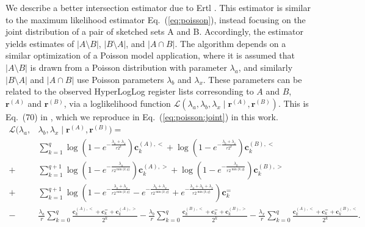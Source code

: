 \documentclass[10]{report}
\begin{document}
We describe a better intersection estimator due to Ertl \cite{ertl2017new}.
This estimator is similar to the maximum likelihood estimator Eq.~(\ref{eq:poisson}), instead focusing on the joint distribution of a pair of sketched sets A and B.
Accordingly, the estimator yields estimates of $|A \setminus B|$, $|B \setminus A|$, and $|A \cap B|$. 
The algorithm depends on a similar optimization of a Poisson model application, where it is assumed that $|A \setminus B|$ is drawn from a Poisson distribution with parameter $\lambda_a$, and similarly $|B \setminus A|$ and $|A \cap B|$ use Poisson parameters $\lambda_b$ and $\lambda_x$. These parameters can be related to the observed HyperLogLog register lists corresonding to $A$ and $B$, $\mathbf{r}^{(A)}$ and $\mathbf{r}^{(B)}$, via a loglikelihood function $\mathcal{L}(\lambda_a, \lambda_b, \lambda_x \mid \mathbf{r}^{(A)}, \mathbf{r}^{(B)})$. 
This is Eq.~(70) in \cite{ertl2017new}, which we reproduce in Eq.~(\ref{eq:poisson:joint}) in this work. 
%
\begin{equation} \label{eq:poisson:joint}
\begin{alignedat}{1} 
		\mathcal{L}(\lambda_a, &\lambda_b, \lambda_x \mid \mathbf{r}^{(A)}, \mathbf{r}^{(B)}) = 
		\\
		&\sum_{k=1}^q \log \left ( 1 - e^{-\frac{\lambda_a + \lambda_x}{r2^k}} \right ) \mathbf{c}^{(A), <}_k 
		+ \log \left ( 1 - e^{-\frac{\lambda_b + \lambda_x}{r2^k}} \right ) \mathbf{c}^{(B), <}_k
		\\
		+ &\sum_{k=1}^{q+1} \log \left ( 1 - e^{-\frac{\lambda_a}{r2^{\min\{k,q\}}}} \right ) \mathbf{c}^{(A), >}_k
		+ \log \left ( 1 - e^{-\frac{\lambda_b}{r2^{\min\{k,q\}}}} \right ) \mathbf{c}^{(B), >}_k 
		\\
		+ &\sum_{k=1}^{q+1} \log \left ( 1 - e^{-\frac{\lambda_a + \lambda_x}{r2^{\min\{k,q\}}}} 
				- e^{-\frac{\lambda_b + \lambda_x}{r2^{\min\{k,q\}}}} + e^{-\frac{\lambda_a + \lambda_b + \lambda_x}{r2^{\min\{k,q\}}}} \right ) \mathbf{c}^{=}_k 
		\\
		- &\frac{\lambda_a}{r} \sum_{k=0}^q \frac{\mathbf{c}^{(A),<}_k + \mathbf{c}^{=}_k + \mathbf{c}^{(A),>}_k}{2^k}
		- \frac{\lambda_b}{r} \sum_{k=0}^q \frac{\mathbf{c}^{(B),<}_k + \mathbf{c}^{=}_k + \mathbf{c}^{(B),>}_k}{2^k}
		- \frac{\lambda_x}{r} \sum_{k=0}^q \frac{\mathbf{c}^{(A),<}_k + \mathbf{c}^{=}_k + \mathbf{c}^{(B),<}_k}{2^k}.
\end{alignedat}
\end{equation}
\end{document}
